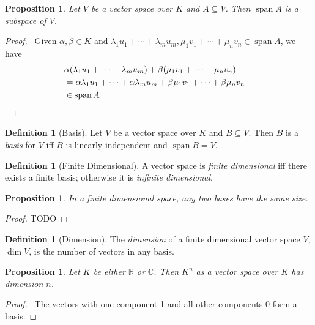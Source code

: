 \documentclass{book}
\let\qed\relax
\newtheorem{prop}[ax]{Proposition}
\theoremstyle{definition}
\newtheorem{df}[ax]{Definition}
\newcommand{\spn}{\ensuremath{\operatorname{span}}}
\begin{document}
\begin{prop}
Let $V$ be a vector space over $K$ and $A \subseteq V$. Then $\spn A$ is a subspace of $V$.
\end{prop}

\begin{proof}
\pf\ Given $\alpha, \beta \in K$ and $\lambda_1 u_1 + \cdots + \lambda_m u_m, \mu_1 v_1 + \cdots + \mu_n v_n \in \spn A$, we have
\begin{align*}
& \alpha (\lambda_1 u_1 + \cdots + \lambda_m u_m) + \beta (\mu_1 v_1 + \cdots + \mu_n v_n) \\
& = \alpha \lambda_1 u_1 + \cdots + \alpha \lambda_m u_m + \beta \mu_1 v_1 + \cdots + \beta \mu_n v_n \\
& \in \spn A & \qed
\end{align*}
\end{proof}

\begin{df}[Basis]
Let $V$ be a vector space over $K$ and $B \subseteq V$. Then $B$ is a \emph{basis} for $V$ iff $B$ is linearly independent and $\spn B = V$.
\end{df}

\begin{df}[Finite Dimensional]
A vector space is \emph{finite dimensional} iff there exists a finite basis; otherwise it is \emph{infinite dimensional}.
\end{df}

\begin{prop}
In a finite dimensional space, any two bases have the same size.
\end{prop}

\begin{proof}
TODO
\end{proof}

\begin{df}[Dimension]
The \emph{dimension} of a finite dimensional vector space $V$, $\dim V$, is the number of vectors in any basis.
\end{df}

\begin{prop}
Let $K$ be either $\mathbb{R}$ or $\mathbb{C}$. Then $K^n$ as a vector space over $K$ has dimension $n$.
\end{prop}

\begin{proof}
\pf\ The vectors with one component 1 and all other components 0 form a basis. \qed
\end{proof}
\end{document}
